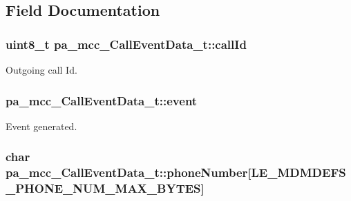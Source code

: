\subsection{Field Documentation}
\subsubsection[{\texorpdfstring{call\+Id}{callId}}]{\setlength{\rightskip}{0pt plus 5cm}uint8\+\_\+t pa\+\_\+mcc\+\_\+\+Call\+Event\+Data\+\_\+t\+::call\+Id}\hypertarget{structpa__mcc___call_event_data__t_a88613e6f82b16ff79d1aa7f2682e064b}{}\label{structpa__mcc___call_event_data__t_a88613e6f82b16ff79d1aa7f2682e064b}


Outgoing call Id. 

\subsubsection[{\texorpdfstring{event}{event}}]{ pa\+\_\+mcc\+\_\+\+Call\+Event\+Data\+\_\+t\+::event}\hypertarget{structpa__mcc___call_event_data__t_a63c1fc87197094a915fd720803a99048}{}\label{structpa__mcc___call_event_data__t_a63c1fc87197094a915fd720803a99048}


Event generated. 

\subsubsection[{\texorpdfstring{phone\+Number}{phoneNumber}}]{\setlength{\rightskip}{0pt plus 5cm}char pa\+\_\+mcc\+\_\+\+Call\+Event\+Data\+\_\+t\+::phone\+Number\mbox{[}{\bf L\+E\+\_\+\+M\+D\+M\+D\+E\+F\+S\+\_\+\+P\+H\+O\+N\+E\+\_\+\+N\+U\+M\+\_\+\+M\+A\+X\+\_\+\+B\+Y\+T\+ES}\mbox{]}}\hypertarget{structpa__mcc___call_event_data__t_a055dcf52e34d1192aa8bcd77dc7460b9}{}\label{structpa__mcc___call_event_data__t_a055dcf52e34d1192aa8bcd77dc7460b9}


